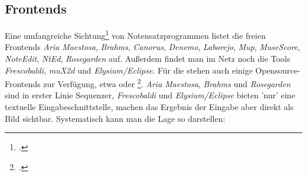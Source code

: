 %
%
%



\subsection{Frontends}

Eine umfangreiche Sichtung\footcite[vgl.][\nopage wp]{WpedNotensatz2019a} von
Notensatzprogrammen listet die freien Frontends \textit{Aria Maestosa},
\textit{Brahms}, \textit{Canorus}, \textit{Denemo}, \textit{Laborejo},
\textit{Mup}, \textit{MuseScore}, \textit{NoteEdit}, \textit{NtEd},
\textit{Rosegarden} auf. Außerdem findet man im Netz noch die Tools
\textit{Frescobaldi}, \textit{muX2d} und \textit{Elysium/Eclipse}.
Für die  stehen auch einige Opensource-Frontends zur
Verfügung, etwa  oder \footcite[vgl.][\nopage
wp]{Abc2018b}. \textit{Aria Maestosa}, \textit{Brahms} und \textit{Rosegarden}
sind in erster Linie \textsf{Sequenzer}, \textit{Frescobaldi} und
\textit{Elysium/Eclipse} bieten 'nur' eine textuelle Eingabeschnittstelle,
machen das Ergebnis der Eingabe aber direkt als Bild sichtbar. Systematisch kann
man die Lage so darstellen:
 
